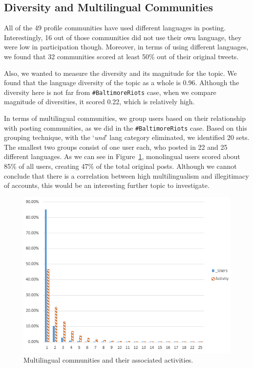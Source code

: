 \subsection{Diversity and Multilingual Communities}

All of the 49 profile communities have used different languages
in posting. Interestingly, 16 out of those communities did not use
their own language, they were low in participation though. Moreover,
in terms of using different languages, we found that 32 communities
scored at least 50\% out of their original tweets. 

Also, we wanted to measure the diversity and its magnitude for the topic. 
We found that the language diversity of the topic as a whole is 0.96. Although 
the diversity here is not far from  {\texttt{\#BaltimoreRiots}} case, when we compare 
magnitude of diversities, it scored 0.22, which is relatively high.

In terms of multilingual communities, we group users based on their relationship with
posting communities, as we did in the {\texttt{\#BaltimoreRiots}} case.
Based on this grouping technique, with the `{\emph{und}}' lang category eliminated, we
identified 20 sets. The smallest two groups consist of one user each,
who posted in 22 and 25 different languages.  As we can see in
Figure~\ref{fig:multilingual}, monolingual users scored about 85\% of
all users, creating 47\% of the total original posts. Although we cannot conclude
that there is a correlation between high multilingualism and
illegitimacy of accounts, this would be an interesting further topic
to investigate.

\begin{figure}[htb]
\centering
\includegraphics[width=\columnwidth]{images/multilingualcommunities.png}
\caption{Multilingual communities and their associated activities.}
\label{fig:multilingual}
\end{figure}


